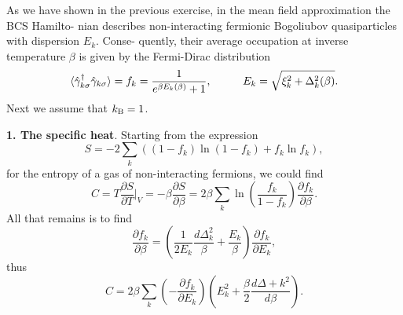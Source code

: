 As we have shown in the previous exercise, in the mean field approximation the BCS Hamilto-
nian describes non-interacting fermionic Bogoliubov quasiparticles with dispersion $E_k$. Conse-
quently, their average occupation at inverse temperature $\beta$ is given by the Fermi-Dirac
distribution
\begin{equation*}
	\langle \hat{\gamma}_{k \sigma}\D \hat{\gamma}_{k \sigma}\rangle = f_k = \frac{1}{e^{\beta E_k(\beta)} + 1},
	\hspace{10 mm} 
	E_k = \sqrt{\xi_k^2 + \Delta_k^2(\beta)}.
\end{equation*}
Next we assume that $k_{\textnormal{B}} = 1$.

\textbf{1. The specific heat}.  Starting from the expression
\begin{equation*}
	S = - 2 \sum_k \left(
		(1-f_k) \ln (1-f_k) + f_k \ln f_k
	\right),
\end{equation*}
for the entropy of a gas of non-interacting fermions, we could find 
\begin{equation*}
	C = T \frac{\partial S}{\partial T} \bigg|_V = - \beta \frac{\partial S}{\partial \beta}  = 2 \beta \sum_k \ln\left(\frac{f_k}{1-f_k}\right) \frac{\partial f_k}{\partial \beta}.
\end{equation*}
All that remains is to find
\begin{equation*}
	\frac{\partial f_k}{\partial \beta} = \left(\frac{1}{2E_k } \frac{d \Delta_k^2}{\beta} + \frac{E_k}{\beta}\right) \frac{\partial f_k}{\partial E_k},
\end{equation*}
thus
\begin{equation*}
	C = 2 \beta \sum_k \left(- \frac{\partial f_k}{\partial E_k} \right) \left(
		E_k^2 + \frac{\beta}{2} \frac{d \Delta+k^2}{d \beta} 
	\right).
\end{equation*}


